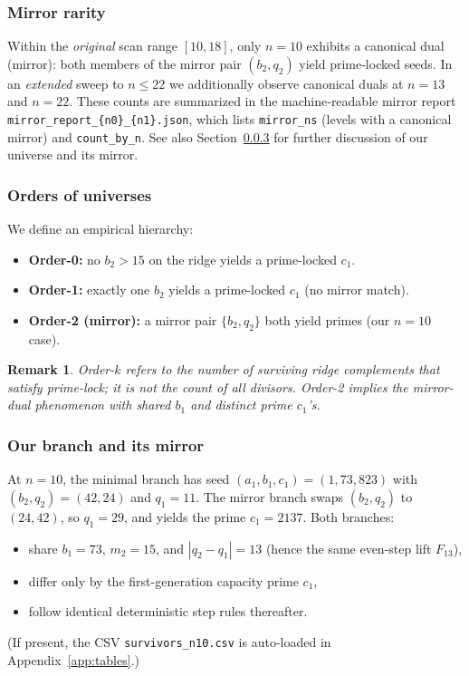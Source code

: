 \documentclass[12pt]{article}
\newtheorem{remark}[theorem]{Remark}
\numberwithin{equation}{section}
\begin{document}
\subsubsection{Mirror rarity}
Within the \emph{original} scan range $[10,18]$, only $n=10$ exhibits a canonical dual (mirror): both members of the mirror pair $(b_2,q_2)$ yield prime‑locked seeds. In an \emph{extended} sweep to $n\le 22$ we additionally observe canonical duals at $n=13$ and $n=22$. These counts are summarized in the machine‑readable mirror report \texttt{mirror\_report\_\{n0\}\_\{n1\}.json}, which lists \texttt{mirror\_ns} (levels with a canonical mirror) and \texttt{count\_by\_n}. See also Section~\ref{subsec:ourandmirror} for further discussion of our universe and its mirror.

\subsubsection{Orders of universes}
We define an empirical hierarchy:
\begin{itemize}
  \item \textbf{Order-0:} no $b_2>15$ on the ridge yields a prime-locked $c_1$.
  \item \textbf{Order-1:} exactly one $b_2$ yields a prime-locked $c_1$ (no mirror match).
  \item \textbf{Order-2 (mirror):} a mirror pair $\{b_2,q_2\}$ both yield primes (our $n=10$ case).
\end{itemize}

\begin{remark}
Order-$k$ refers to the number of \emph{surviving} ridge complements that satisfy prime-lock; it is not the count of all divisors. Order-2 implies the mirror-dual phenomenon with shared $b_1$ and distinct prime $c_1$'s.
\end{remark}

\subsubsection{Our branch and its mirror}\label{subsec:ourandmirror}
At $n=10$, the minimal branch has seed $(a_1,b_1,c_1)=(1,73,823)$ with $(b_2,q_2)=(42,24)$ and $q_1=11$.  
The mirror branch swaps $(b_2,q_2)$ to $(24,42)$, so $q_1=29$, and yields the prime $c_1=2137$.
Both branches:
\begin{itemize}
  \item share $b_1=73$, $m_2=15$, and $|q_2-q_1|=13$ (hence the same even-step lift $F_{13}$),
  \item differ only by the first-generation capacity prime $c_1$,
  \item follow identical deterministic step rules thereafter.
\end{itemize}
(If present, the CSV \texttt{survivors\_n10.csv} is auto-loaded in Appendix~\ref{app:tables}.)
\end{document}
